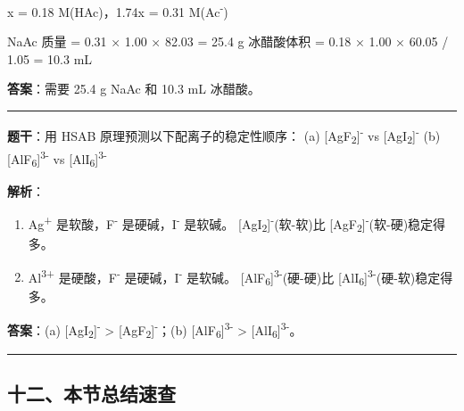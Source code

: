 \documentclass[a4paper,11pt]{ctexart}
\newcommand{\箭}{\ensuremath{\rightarrow}}
\newcommand{\左箭}{\ensuremath{\leftarrow}}
\newcommand{\上箭}{\ensuremath{\uparrow}}
\newcommand{\下箭}{\ensuremath{\downarrow}}
\newcommand{\衡}{\ensuremath{\rightleftharpoons}}
\newcommand{\双箭}{\ensuremath{\leftrightarrow}}
\newcommand{\约等于}{\ensuremath{\approx}}
\newcommand{\小于等于}{\ensuremath{\leq}}
\newcommand{\大于等于}{\ensuremath{\geq}}
\newcommand{\不等于}{\ensuremath{\neq}}
\newcommand{\西格马}{\ensuremath{\sigma}}
\newcommand{\派}{\ensuremath{\pi}}
\begin{document}
x = 0.18 M(HAc)，1.74x = 0.31 M(Ac\textsuperscript{-})

NaAc 质量 = 0.31 × 1.00 × 82.03 = 25.4 g
冰醋酸体积 = 0.18 × 1.00 × 60.05 / 1.05 = 10.3 mL

\textbf{答案}：需要 25.4 g NaAc 和 10.3 mL 冰醋酸。

\begin{center}\rule{0.5\linewidth}{0.5pt}\end{center}

\textbf{题干}：用 HSAB 原理预测以下配离子的稳定性顺序：
(a) {[}AgF\textsubscript{2}{]}\textsuperscript{-} vs {[}AgI\textsubscript{2}{]}\textsuperscript{-}
(b) {[}AlF\textsubscript{6}{]}\textsuperscript{3-} vs {[}AlI\textsubscript{6}{]}\textsuperscript{3-}

\textbf{解析}：

\begin{enumerate}
\def\labelenumi{(\alph{enumi})}
\item
  Ag\textsuperscript{+} 是软酸，F\textsuperscript{-} 是硬碱，I\textsuperscript{-} 是软碱。
  {[}AgI\textsubscript{2}{]}\textsuperscript{-}(软-软)比 {[}AgF\textsubscript{2}{]}\textsuperscript{-}(软-硬)稳定得多。
\item
  Al\textsuperscript{3+} 是硬酸，F\textsuperscript{-} 是硬碱，I\textsuperscript{-} 是软碱。
  {[}AlF\textsubscript{6}{]}\textsuperscript{3-}(硬-硬)比 {[}AlI\textsubscript{6}{]}\textsuperscript{3-}(硬-软)稳定得多。
\end{enumerate}

\textbf{答案}：(a) {[}AgI\textsubscript{2}{]}\textsuperscript{-} \textgreater{} {[}AgF\textsubscript{2}{]}\textsuperscript{-}；(b) {[}AlF\textsubscript{6}{]}\textsuperscript{3-} \textgreater{} {[}AlI\textsubscript{6}{]}\textsuperscript{3-}。

\begin{center}\rule{0.5\linewidth}{0.5pt}\end{center}

\subsection{十二、本节总结速查}\label{ux5341ux4e8cux672cux8282ux603bux7ed3ux901fux67e5}
\end{document}
